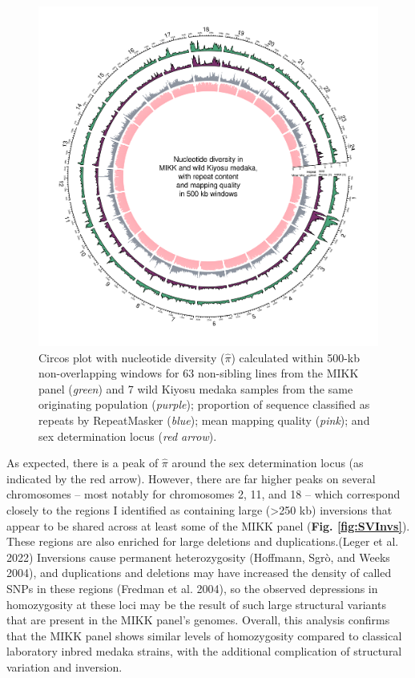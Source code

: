\documentclass[
]{book}
\begin{document}
\begin{figure}
\includegraphics[width=1\linewidth]{figs/mikk_genome/supp_01_pi_circos} \caption{Circos plot with nucleotide diversity (\(\hat{\pi}\)) calculated within 500-kb non-overlapping windows for 63 non-sibling lines from the MIKK panel (\emph{green}) and 7 wild Kiyosu medaka samples from the same originating population (\emph{purple}); proportion of sequence classified as repeats by RepeatMasker (\emph{blue}); mean mapping quality (\emph{pink}); and sex determination locus (\emph{red arrow}).}\label{fig:NucleotideDiversity}
\end{figure}

As expected, there is a peak of \(\hat{\pi}\) around the sex determination locus (as indicated by the red arrow). However, there are far higher peaks on several chromosomes -- most notably for chromosomes 2, 11, and 18 -- which correspond closely to the regions I identified as containing large (\textgreater250 kb) inversions that appear to be shared across at least some of the MIKK panel (\textbf{Fig. \ref{fig:SVInvs}}). These regions are also enriched for large deletions and duplications.(Leger et al. 2022) Inversions cause permanent heterozygosity (Hoffmann, Sgrò, and Weeks 2004), and duplications and deletions may have increased the density of called SNPs in these regions (Fredman et al. 2004), so the observed depressions in homozygosity at these loci may be the result of such large structural variants that are present in the MIKK panel's genomes. Overall, this analysis confirms that the MIKK panel shows similar levels of homozygosity compared to classical laboratory inbred medaka strains, with the additional complication of structural variation and inversion.
\end{document}
